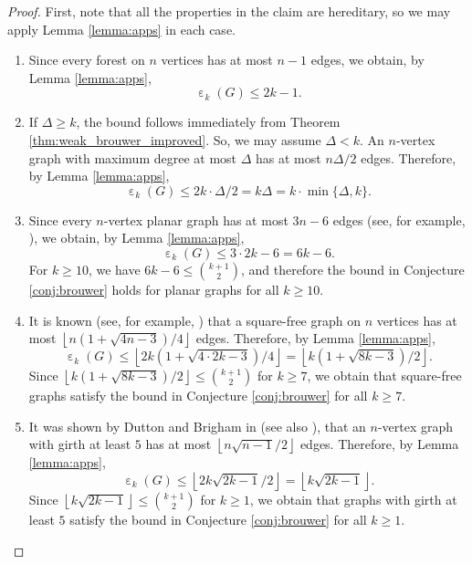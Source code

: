 \documentclass[a4paper,11pt]{article}
\theoremstyle{plain}
\theoremstyle{definition}
\numberwithin{theorem}{section}
\numberwithin{equation}{section}
\DeclareMathOperator{\eps}{\varepsilon}
\begin{document}
\begin{proof}
    First, note that all the properties in the claim are hereditary, so we may apply Lemma \ref{lemma:apps} in each case.
    \begin{enumerate}
        \item Since every forest on $n$ vertices has at most $n-1$ edges, we obtain, by Lemma \ref{lemma:apps},
        \[
            \eps_k(G)\le 2k-1.
        \]
        \item If $\Delta\ge k$, the bound follows immediately from Theorem \ref{thm:weak_brouwer_improved}. So, we may assume $\Delta<k$. 
        An $n$-vertex graph with maximum degree at most $\Delta$ has at most $n\Delta/2$ edges. Therefore, by Lemma \ref{lemma:apps},
        \[
            \eps_k(G)\le 2k\cdot\Delta/2= k\Delta= k \cdot \min\{\Delta,k\}.
        \]
        \item Since every $n$-vertex planar graph has at most $3n-6$ edges (see, for example, \cite[Chapter I, Theorem 16]{bollobas1998modern}), we obtain, by Lemma \ref{lemma:apps},
        \[
            \eps_k(G)\le 3\cdot2k-6=6k-6.
        \]
        For $k\ge 10$, we have $6k-6\le \binom{k+1}{2}$, and therefore the bound in Conjecture \ref{conj:brouwer} holds for planar graphs for all $k\ge 10$.
        \item It is known (see, for example, \cite[Chapter IV, Theorem 12]{bollobas1998modern}) that a square-free graph on $n$ vertices has at most $\left\lfloor n(1+\sqrt{4n-3})/4\right\rfloor$ edges. Therefore, by Lemma \ref{lemma:apps},
        \[
            \eps_k(G)\le \left\lfloor2k(1+\sqrt{4\cdot 2k-3})/4 \right\rfloor=\left\lfloor k(1+\sqrt{8k-3})/2\right\rfloor.
        \]
        Since $\left\lfloor k(1+\sqrt{8k-3})/2\right\rfloor\le \binom{k+1}{2}$ for $k\ge 7$, we obtain that square-free graphs satisfy the bound in Conjecture \ref{conj:brouwer} for all $k\ge 7$.
        \item It was shown by Dutton and Brigham in \cite[Theorem 4]{dutton1991edges} (see also \cite[Theorem 4.2]{vanlint2001course}), that an $n$-vertex graph with girth at least $5$ has at most $\left\lfloor n\sqrt{n-1}/2\right\rfloor $ edges. Therefore, by Lemma \ref{lemma:apps},
        \[
            \eps_k(G)\le \left\lfloor 2k\sqrt{2k-1}/2\right\rfloor =\left\lfloor k\sqrt{2k-1}\right\rfloor.
        \]
        Since $\left\lfloor k\sqrt{2k-1}\right\rfloor \le \binom{k+1}{2}$ for $k\ge 1$, we obtain that graphs with girth at least $5$ satisfy the bound in Conjecture \ref{conj:brouwer} for all $k\ge 1$.
        


\end{enumerate}
\end{proof}
\end{document}
